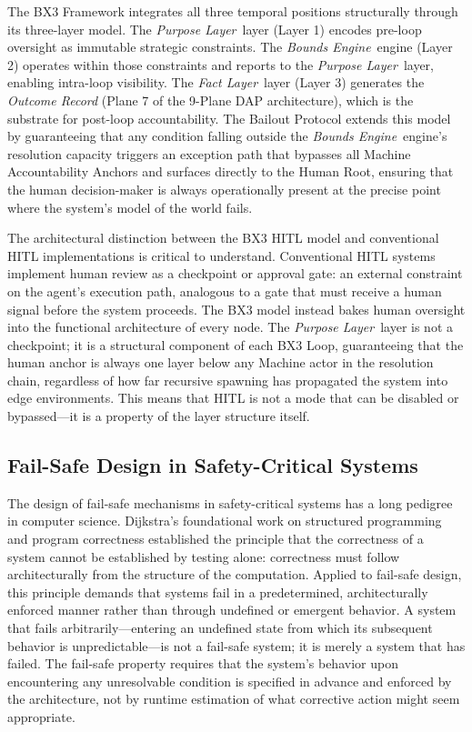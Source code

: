 \documentclass[12pt]{article}
\def\purpose{\textit{Purpose Layer}}
\def\bounds{\textit{Bounds Engine}}
\def\fact{\textit{Fact Layer}}
\begin{document}
The BX3 Framework integrates all three temporal positions structurally through its three-layer model. The \purpose\ layer (Layer 1) encodes pre-loop oversight as immutable strategic constraints. The \bounds\ engine (Layer 2) operates within those constraints and reports to the \purpose\ layer, enabling intra-loop visibility. The \fact\ layer (Layer 3) generates the \textit{Outcome Record} (Plane 7 of the 9-Plane DAP architecture), which is the substrate for post-loop accountability. The Bailout Protocol extends this model by guaranteeing that any condition falling outside the \bounds\ engine's resolution capacity triggers an exception path that bypasses all Machine Accountability Anchors and surfaces directly to the Human Root, ensuring that the human decision-maker is always operationally present at the precise point where the system's model of the world fails.

The architectural distinction between the BX3 HITL model and conventional HITL implementations is critical to understand. Conventional HITL systems implement human review as a checkpoint or approval gate: an external constraint on the agent's execution path, analogous to a gate that must receive a human signal before the system proceeds. The BX3 model instead bakes human oversight into the functional architecture of every node. The \purpose\ layer is not a checkpoint; it is a structural component of each BX3 Loop, guaranteeing that the human anchor is always one layer below any Machine actor in the resolution chain, regardless of how far recursive spawning has propagated the system into edge environments. This means that HITL is not a mode that can be disabled or bypassed—it is a property of the layer structure itself.

\subsection{Fail-Safe Design in Safety-Critical Systems}

The design of fail-safe mechanisms in safety-critical systems has a long pedigree in computer science. Dijkstra's foundational work on structured programming and program correctness \cite{dijkstra1982} established the principle that the correctness of a system cannot be established by testing alone: correctness must follow architecturally from the structure of the computation. Applied to fail-safe design, this principle demands that systems fail in a predetermined, architecturally enforced manner rather than through undefined or emergent behavior. A system that fails arbitrarily—entering an undefined state from which its subsequent behavior is unpredictable—is not a fail-safe system; it is merely a system that has failed. The fail-safe property requires that the system's behavior upon encountering any unresolvable condition is specified in advance and enforced by the architecture, not by runtime estimation of what corrective action might seem appropriate.
\end{document}
